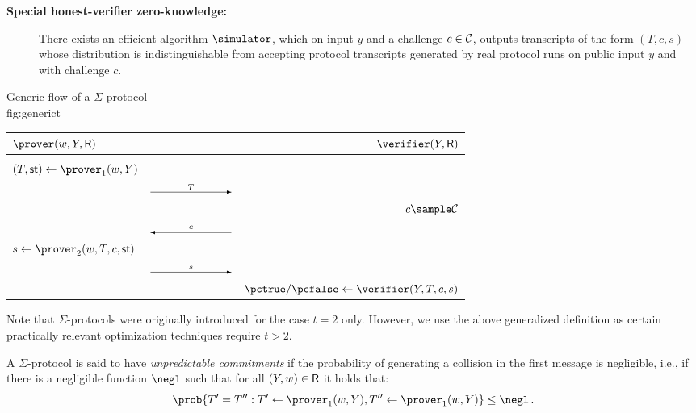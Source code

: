 \documentclass[runningheads]{llncs}
\begin{document}
\begin{definition}
\begin{description}
      \item[\bf Special honest-verifier zero-knowledge:]
      There exists an efficient algorithm $\simulator$, which on input $y$ and a challenge $c\in\mathcal{C}$, outputs transcripts of the form $(T,c,s)$ whose distribution is indistinguishable from accepting protocol transcripts generated by real protocol runs on public input $y$ and with challenge $c$.
  \end{description}
    \begin{protocol}{Generic flow of a $\Sigma$-protocol\\[-2.25em]}{fig:generic}{t}
      \begin{tabular}{@{}l@{\hspace{-2em}}c@{\hspace{-2em}}r@{}}
        $\prover(w,Y,\relation)$ & & $\verifier(Y,\relation)$  \\
        \hline  \\
        $ (T,\st) \gets \prover_1(w,Y)$\\
        & $\sendr{T}{100}$ \\[2 ex]
        & & $c \sample \CS$ \\
        & $\sendl{c}{100}$ & \\[2 ex]
        $ s \gets \prover_2(w,T,c,\st)$\\
        & $\sendr{s}{100}$ \\[2 ex]
        & & $\accept/\reject \gets \verifier(Y,T,c,s)$ \\
      \end{tabular}
    \end{protocol}
\end{definition}
Note that $\Sigma$-protocols were originally introduced for the case $t=2$ only.
However, we use the above generalized definition as certain practically relevant optimization techniques require $t>2$.

A $\Sigma$-protocol is said to have \emph{unpredictable commitments} if the probability of generating a collision in the first message is negligible, i.e., if there is a negligible function $\negl$ such that for all $(Y,w)\in\mathsf{R}$ it holds that:
\[
  \prob{T'=T'' : T'\gets\prover_1(w,Y), T''\gets\prover_1(w,Y)} \leq \negl\,.
\]
\end{document}
